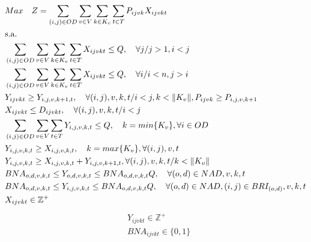 \begin{align}
	 & Max \quad Z = \sum_{(i,j)\in OD} \sum_{v\in V} \sum_{k\in K_v} \sum_{t\in T} P_{ijvk} X_{ijvkt}                                 \label{eq: m2_fo}                          \\
	 & \text{s.a.}  \notag                                                                                                                                                        \\
	 & \sum_{(i,j)\in OD}\sum_{v\in V}\sum_{k\in K_v}\sum_{t\in T}X_{ijvkt} \leq Q , \quad \forall j / j>1, i<j                        \label{eq: m2_cap_assig_destino}           \\
	 & \sum_{(i,j)\in OD}\sum_{v\in V}\sum_{k\in K_v}\sum_{t\in T}X_{ijvkt} \leq Q , \quad \forall i / i<n, j>i                        \label{eq: m2_cap_assig_origem}            \\
	 & Y_{ijvkt} \geq Y_{i,j,v,k+1,t},  \quad \forall (i,j),v,k,t / i < j, k < \lVert K_v \rVert,  P_{ijvk} \geq P_{i,j,v,k+1}         \label{eq: m2_jerar_class}                 \\
	 & X_{ijvkt} \leq D_{ijvkt},  \quad \forall (i,j),v,k,t/ i < j                                                                     \label{eq: m2_assig_menor_dem}             \\
	 & \sum_{(i,j) \in OD}\sum_{v\in V}\sum_{t\in T} Y_{i,j,v,k,t} \leq Q, \quad  k = min\{K_v\}, \forall i \in OD                     \label{eq: m2_cap_autho_1er_class}         \\
	 & Y_{i,j,v,k,t} \geq  X_{i,j,v,k,t},  \quad k = max\{K_v\}, \forall(i,j),v,t                                                      \label{eq: m2_autho_mayor_assig_1er_class} \\
	 & Y_{i,j,v,k,t} \geq  X_{i,j,v,k,t} + Y_{i,j,v,k + 1,t} , \forall(i,j),v, k, t / k < \lVert K_v\rVert                             \label{eq: m2_autho_mayor_assig_mas_autho} \\
	 & BNA_{o,d,v,k,t} \leq Y_{o,d,v,k,t} \leq BNA_{o,d,v,k,t} Q, \quad  \forall (o,d)\in NAD, v, k, t                                 \label{eq: m2_activ_bin_autho}             \\
	 & BNA_{o,d,v,k,t} \leq Y_{i,j,v,k,t} \leq BNA_{o,d,v,k,t} Q, \quad  \forall (o,d)\in NAD, (i,j) \in BRI_{(o,d)}, v,k,t            \label{eq: m2_autho_igualar_trecho_maior}  \\
	 & X_{ijvkt} \in \mathbb{Z}^+                                                                                                      \label{eq: m2_dom_assig}                  %
\end{align}
\begin{align}
	& Y_{ijvkt} \in \mathbb{Z}^+                                                                                                      \label{eq: m2_dom_autho}                   \\
	& BNA_{ijvkt} \in \{0,1\}                                                                                                         \label{eq: m2_dom_bin_nadja}
\end{align}

